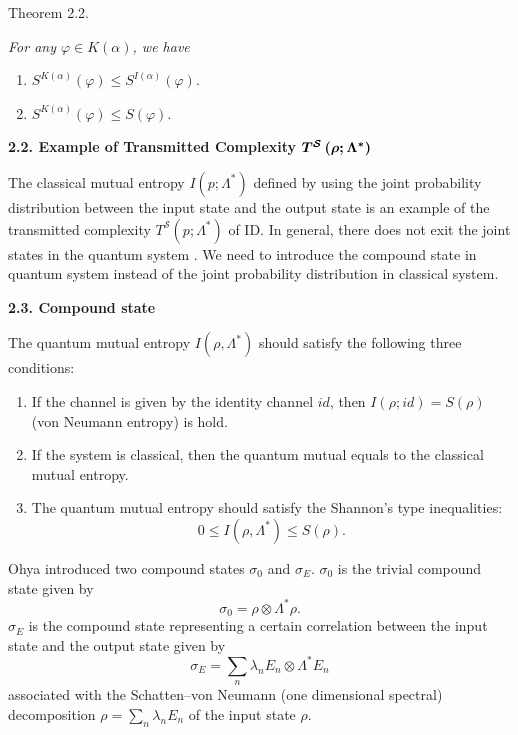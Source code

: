 {\small \sc Theorem 2.2.}{\it
For any  $  \varphi \in K(\alpha ) $,   we have

\begin{enumerate}
\item[\rm (1)]  $  S^{K( \alpha) }(\varphi )\leq S^{I(\alpha )}(\varphi
) $.

\item[\rm (2)]  $  S^{K( \alpha) }(\varphi )\leq S(\varphi ) $.
\end{enumerate}
}

\smallskip
\textbf{2.2. Example of Transmitted Complexity  $  \boldsymbol{T^{\mathcal{S}}\left( \protect%
\rho ;\Lambda ^{\ast }\right) } $  }

The classical mutual entropy  $  I\left( p;{\Lambda ^{\ast }}\right)  $   defined
by using the joint probability distribution between the input state and the
output state is an example of the transmitted complexity  $  T^{\mathcal{S}%
}\left( p{;\Lambda ^{\ast }}\right)  $   of ID. In general, there does not exit
the joint states in the quantum system \cite{nv:-Urb}.  We need to introduce
the compound state in quantum system instead of the joint probability
distribution in classical system.

\smallskip
\textbf{2.3. Compound state}

The quantum mutual entropy  $  I\left( {\rho, \Lambda ^{\ast }}\right)  $   should
satisfy the following three con\-ditions:

\begin{enumerate}
\item If the channel is given by the identity channel  $  id $,   then  $  I\left(
\rho ;id\right) =S( \rho)  $   (von Neumann entropy) is hold.

\item If the system is classical, then the quantum mutual equals to the
classical mutual entropy.

\item The quantum mutual entropy should satisfy the Shannon's type
inequalities:%
\[
0\leq I\left( {\rho, \Lambda ^{\ast }}\right) \leq {S( \rho) }. 
\]
\end{enumerate}

Ohya introduced two compound states  $  \sigma _{0} $   and  $  \sigma _{E} $.    $  %
\sigma _{0} $   is the trivial compound state given by 
\[
\sigma _{0}=\rho \otimes {\Lambda ^{\ast }\rho.} 
\]%
 $  \sigma _{E} $   is the compound state representing a certain correlation
between the input state and the output state given by%
\[
\sigma _{E}=\sum_{n}\lambda _{n}E_{n}\otimes \Lambda ^{\ast }E_{n} 
\]
associated with the Schatten--von Neumann (one dimensional spectral)
decompo\-sition \cite{nv:-Sch}  $  \rho =\sum\nolimits_{n}\lambda _{n}E_{n} $   of the
input state  $  \rho  $.

